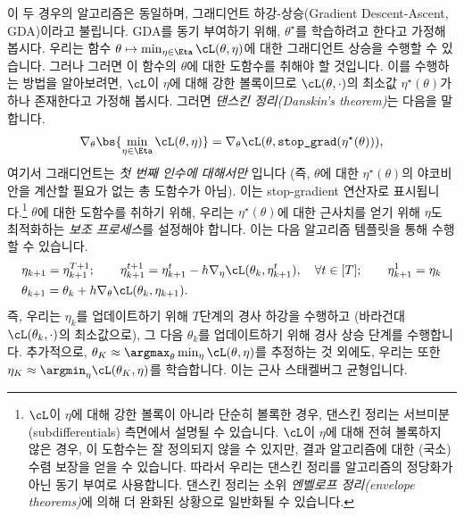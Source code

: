 \documentclass[../../book-main_ko.tex]{subfiles}
\begin{document}
이 두 경우의 알고리즘은 동일하며, 그래디언트 하강-상승(Gradient Descent-Ascent, GDA)이라고 불립니다. GDA를 동기 부여하기 위해, \(\theta^{\star}\)를 학습하려고 한다고 가정해 봅시다. 우리는 함수 \(\theta \mapsto \min_{\eta \in \Eta}\cL(\theta, \eta)\)에 대한 그래디언트 상승을 수행할 수 있습니다. 그러나 그러면 이 함수의 \(\theta\)에 대한 도함수를 취해야 할 것입니다. 이를 수행하는 방법을 알아보려면, \(\cL\)이 \(\eta\)에 대해 강한 볼록이므로 \(\cL(\theta, \cdot)\)의 최소값 \(\eta^{\star}(\theta)\)가 하나 존재한다고 가정해 봅시다. 그러면 \textit{댄스킨 정리(Danskin's theorem)}는 다음을 말합니다.
\begin{equation}
    \nabla_{\theta}\bs{\min_{\eta \in \Eta}\cL(\theta, \eta)} = \nabla_{\theta}\cL(\theta, \texttt{stop\_grad}(\eta^{\star}(\theta))),
\end{equation}
여기서 그래디언트는 \textit{첫 번째 인수에 대해서만} 입니다 (즉, \(\theta\)에 대한 \(\eta^{\star}(\theta)\)의 야코비안을 계산할 필요가 없는 총 도함수가 아님). 이는 stop-gradient 연산자로 표시됩니다.\footnote{\(\cL\)이 \(\eta\)에 대해 강한 볼록이 아니라 단순히 볼록한 경우, 댄스킨 정리는 서브미분(subdifferentials) 측면에서 설명될 수 있습니다. \(\cL\)이 \(\eta\)에 대해 전혀 볼록하지 않은 경우, 이 도함수는 잘 정의되지 않을 수 있지만, 결과 알고리즘에 대한 (국소) 수렴 보장을 얻을 수 있습니다. 따라서 우리는 댄스킨 정리를 알고리즘의 정당화가 아닌 동기 부여로 사용합니다. 댄스킨 정리는 소위 \textit{엔벨로프 정리(envelope theorems)}에 의해 더 완화된 상황으로 일반화될 수 있습니다.}
\(\theta\)에 대한 도함수를 취하기 위해, 우리는 \(\eta^{\star}(\theta)\)에 대한 근사치를 얻기 위해 \(\eta\)도 최적화하는 \textit{보조 프로세스}를 설정해야 합니다. 이는 다음 알고리즘 템플릿을 통해 수행할 수 있습니다.
\begin{align}
    &\eta_{k + 1} = \eta_{k + 1}^{T + 1}; \qquad \eta_{k + 1}^{t + 1} = \eta_{k + 1}^{t} - h \nabla_{\eta} \cL(\theta_{k}, \eta_{k + 1}^{t}), \quad \forall t \in [T]; \qquad \eta_{k + 1}^{1} = \eta_{k} \\
    &\theta_{k + 1} = \theta_{k} + h \nabla_{\theta}\cL(\theta_{k}, \eta_{k + 1}).
\end{align}
즉, 우리는 \(\eta_{k}\)를 업데이트하기 위해 \(T\)단계의 경사 하강을 수행하고 (바라건대 \(\cL(\theta_{k}, \cdot)\)의 최소값으로), 그 다음 \(\theta_{k}\)를 업데이트하기 위해 경사 상승 단계를 수행합니다. 추가적으로, \(\theta_{K} \approx \argmax_{\theta}\min_{\eta}\cL(\theta, \eta)\)를 추정하는 것 외에도, 우리는 또한 \(\eta_{K} \approx \argmin_{\eta}\cL(\theta_{K}, \eta)\)를 학습합니다. 이는 근사 스태켈버그 균형입니다.
\end{document}
